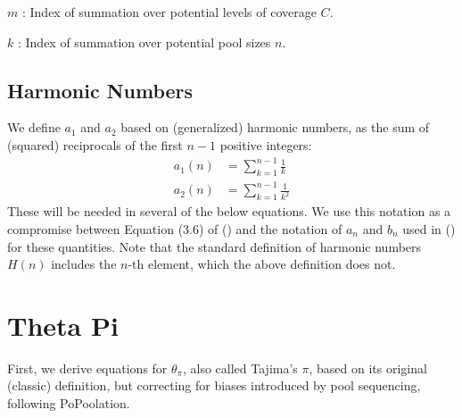 \documentclass[a4paper,9pt,DIV=14]{scrartcl}
\newcommand\citeay[1]{\citeauthor{#1} (\citeyear{#1}) \cite{#1}}
\begin{document}

$m$ :
Index of summation over potential levels of coverage $C$.

$k$ :
Index of summation over potential pool sizes $n$.




\subsection{Harmonic Numbers}
\label{supp:sec:Definitions:sub:HarmonicNumbers}

We define $a_1$ and $a_2$ based on (generalized) harmonic numbers,
as the sum of (squared) reciprocals of the first $n-1$ positive integers:
%
\begin{align}
    \label{eq:an}
    a_1(n) &= \sum_{k=1}^{n-1} \frac{1}{k}
    \\
    \label{eq:bn}
    a_2(n) &= \sum_{k=1}^{n-1} \frac{1}{k^2}
\end{align}
%
These will be needed in several of the below equations.
We use this notation as a compromise between Equation (3.6) of \citeay{Hahn2018} and the notation of $a_n$ and $b_n$ used in \citeay{Achaz2008} for these quantities.
Note that the standard definition of harmonic numbers $H(n)$ includes the $n$-th element, which the above definition does not.


\section{Theta Pi}
\label{supp:sec:ThetaPi}

First, we derive equations for $\theta_\pi$, also called Tajima's $\pi$, based on its original (classic) definition, but correcting for biases introduced by pool sequencing, following PoPoolation.
\end{document}
